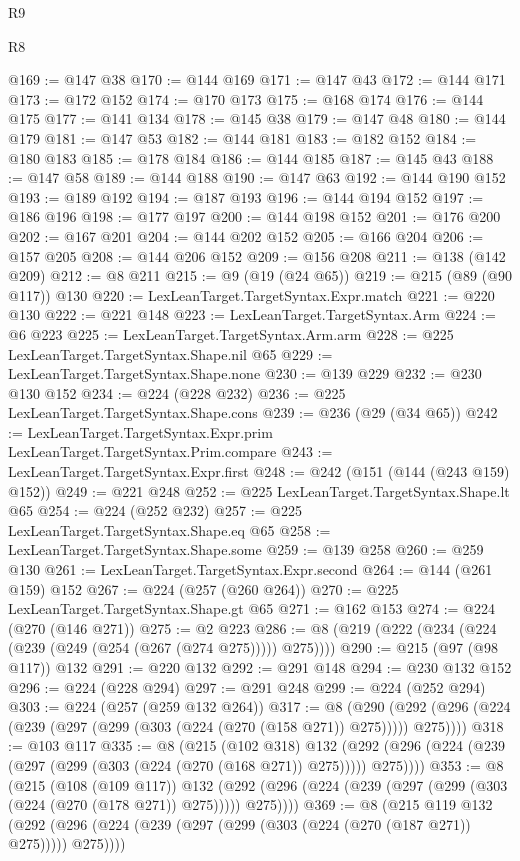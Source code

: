 \begin{lexlean}{R9}
\begin{lexlean}{R8}
\begin{coremodule}
{{{{{{{{{{{{{{{{{{{{{{{{{{{{{{{{{{{{{{{{@169 := @147 @38
@170 := @144 @169
@171 := @147 @43
@172 := @144 @171
@173 := @172 @152
@174 := @170 @173
@175 := @168 @174
@176 := @144 @175
@177 := @141 @134
@178 := @145 @38
@179 := @147 @48
@180 := @144 @179
@181 := @147 @53
@182 := @144 @181
@183 := @182 @152
@184 := @180 @183
@185 := @178 @184
@186 := @144 @185
@187 := @145 @43
@188 := @147 @58
@189 := @144 @188
@190 := @147 @63
@192 := @144 @190 @152
@193 := @189 @192
@194 := @187 @193
@196 := @144 @194 @152
@197 := @186 @196
@198 := @177 @197
@200 := @144 @198 @152
@201 := @176 @200
@202 := @167 @201
@204 := @144 @202 @152
@205 := @166 @204
@206 := @157 @205
@208 := @144 @206 @152
@209 := @156 @208
@211 := @138 (@142 @209)
@212 := @8 @211
@215 := @9 (@19 (@24 @65))
@219 := @215 (@89 (@90 @117)) @130
@220 := LexLeanTarget.TargetSyntax.Expr.match
@221 := @220 @130
@222 := @221 @148
@223 := LexLeanTarget.TargetSyntax.Arm
@224 := @6 @223
@225 := LexLeanTarget.TargetSyntax.Arm.arm
@228 := @225 LexLeanTarget.TargetSyntax.Shape.nil @65
@229 := LexLeanTarget.TargetSyntax.Shape.none
@230 := @139 @229
@232 := @230 @130 @152
@234 := @224 (@228 @232)
@236 := @225 LexLeanTarget.TargetSyntax.Shape.cons
@239 := @236 (@29 (@34 @65))
@242 := LexLeanTarget.TargetSyntax.Expr.prim LexLeanTarget.TargetSyntax.Prim.compare
@243 := LexLeanTarget.TargetSyntax.Expr.first
@248 := @242 (@151 (@144 (@243 @159) @152))
@249 := @221 @248
@252 := @225 LexLeanTarget.TargetSyntax.Shape.lt @65
@254 := @224 (@252 @232)
@257 := @225 LexLeanTarget.TargetSyntax.Shape.eq @65
@258 := LexLeanTarget.TargetSyntax.Shape.some
@259 := @139 @258
@260 := @259 @130
@261 := LexLeanTarget.TargetSyntax.Expr.second
@264 := @144 (@261 @159) @152
@267 := @224 (@257 (@260 @264))
@270 := @225 LexLeanTarget.TargetSyntax.Shape.gt @65
@271 := @162 @153
@274 := @224 (@270 (@146 @271))
@275 := @2 @223
@286 := @8 (@219 (@222 (@234 (@224 (@239 (@249 (@254 (@267 (@274 @275))))) @275))))
@290 := @215 (@97 (@98 @117)) @132
@291 := @220 @132
@292 := @291 @148
@294 := @230 @132 @152
@296 := @224 (@228 @294)
@297 := @291 @248
@299 := @224 (@252 @294)
@303 := @224 (@257 (@259 @132 @264))
@317 := @8
    (@290 (@292 (@296 (@224 (@239 (@297 (@299 (@303 (@224 (@270 (@158 @271)) @275))))) @275))))
@318 := @103 @117
@335 := @8
    (@215
      (@102 @318)
      @132
      (@292 (@296 (@224 (@239 (@297 (@299 (@303 (@224 (@270 (@168 @271)) @275))))) @275))))
@353 := @8
    (@215
      (@108 (@109 @117))
      @132
      (@292 (@296 (@224 (@239 (@297 (@299 (@303 (@224 (@270 (@178 @271)) @275))))) @275))))
@369 := @8
    (@215
      @119
      @132
      (@292 (@296 (@224 (@239 (@297 (@299 (@303 (@224 (@270 (@187 @271)) @275))))) @275))))
}}}}}}}}}}}}}}}}}}}}}}}}}}}}}}}}}}}}}}}}
\end{coremodule}
\end{lexlean}
\end{lexlean}
